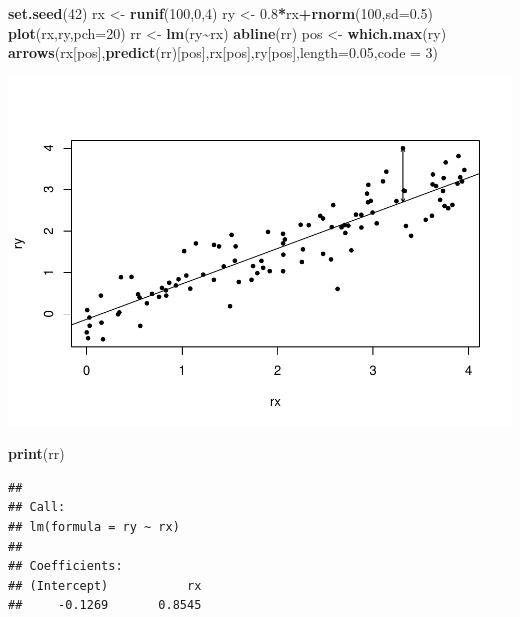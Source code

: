 \documentclass[
]{book}
\newenvironment{Shaded}{\begin{snugshade}}{\end{snugshade}}
\newcommand{\AttributeTok}[1]{\textcolor[rgb]{0.13,0.29,0.53}{#1}}
\newcommand{\DecValTok}[1]{\textcolor[rgb]{0.00,0.00,0.81}{#1}}
\newcommand{\FloatTok}[1]{\textcolor[rgb]{0.00,0.00,0.81}{#1}}
\newcommand{\FunctionTok}[1]{\textcolor[rgb]{0.13,0.29,0.53}{\textbf{#1}}}
\newcommand{\NormalTok}[1]{#1}
\newcommand{\OtherTok}[1]{\textcolor[rgb]{0.56,0.35,0.01}{#1}}
\newcommand{\SpecialCharTok}[1]{\textcolor[rgb]{0.81,0.36,0.00}{\textbf{#1}}}
\begin{document}
\begin{Shaded}
\begin{Highlighting}[]
\FunctionTok{set.seed}\NormalTok{(}\DecValTok{42}\NormalTok{)}
\NormalTok{rx }\OtherTok{\textless{}{-}} \FunctionTok{runif}\NormalTok{(}\DecValTok{100}\NormalTok{,}\DecValTok{0}\NormalTok{,}\DecValTok{4}\NormalTok{)}
\NormalTok{ry }\OtherTok{\textless{}{-}} \FloatTok{0.8}\SpecialCharTok{*}\NormalTok{rx}\SpecialCharTok{+}\FunctionTok{rnorm}\NormalTok{(}\DecValTok{100}\NormalTok{,}\AttributeTok{sd=}\FloatTok{0.5}\NormalTok{)}
\FunctionTok{plot}\NormalTok{(rx,ry,}\AttributeTok{pch=}\DecValTok{20}\NormalTok{)}
\NormalTok{rr }\OtherTok{\textless{}{-}} \FunctionTok{lm}\NormalTok{(ry}\SpecialCharTok{\textasciitilde{}}\NormalTok{rx)}
\FunctionTok{abline}\NormalTok{(rr)}
\NormalTok{pos }\OtherTok{\textless{}{-}} \FunctionTok{which.max}\NormalTok{(ry)}
  \FunctionTok{arrows}\NormalTok{(rx[pos],}\FunctionTok{predict}\NormalTok{(rr)[pos],rx[pos],ry[pos],}\AttributeTok{length=}\FloatTok{0.05}\NormalTok{,}\AttributeTok{code =} \DecValTok{3}\NormalTok{)}
\end{Highlighting}
\end{Shaded}

\includegraphics{_main_files/figure-latex/unnamed-chunk-17-1.pdf}

\begin{Shaded}
\begin{Highlighting}[]
\FunctionTok{print}\NormalTok{(rr)}
\end{Highlighting}
\end{Shaded}

\begin{verbatim}
## 
## Call:
## lm(formula = ry ~ rx)
## 
## Coefficients:
## (Intercept)           rx  
##     -0.1269       0.8545
\end{verbatim}
\end{document}
